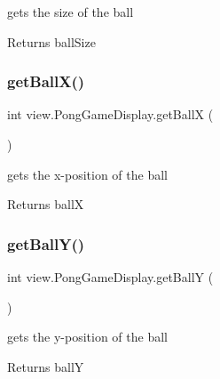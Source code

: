 gets the size of the ball 

\begin{DoxyReturn}{Returns}
ball\+Size 
\end{DoxyReturn}
\hypertarget{classview_1_1_pong_game_display_a83584a112f5bd8877e1bbb1d74dfa080}{}\label{classview_1_1_pong_game_display_a83584a112f5bd8877e1bbb1d74dfa080} 
\subsubsection{\texorpdfstring{get\+Ball\+X()}{getBallX()}}
{\footnotesize\ttfamily int view.\+Pong\+Game\+Display.\+get\+BallX (\begin{DoxyParamCaption}{ }\end{DoxyParamCaption})}



gets the x-\/position of the ball 

\begin{DoxyReturn}{Returns}
ballX 
\end{DoxyReturn}
\hypertarget{classview_1_1_pong_game_display_a940198a68c987548b182d18069ba5885}{}\label{classview_1_1_pong_game_display_a940198a68c987548b182d18069ba5885} 
\subsubsection{\texorpdfstring{get\+Ball\+Y()}{getBallY()}}
{\footnotesize\ttfamily int view.\+Pong\+Game\+Display.\+get\+BallY (\begin{DoxyParamCaption}{ }\end{DoxyParamCaption})}



gets the y-\/position of the ball 

\begin{DoxyReturn}{Returns}
ballY 
\end{DoxyReturn}
\hypertarget{classview_1_1_pong_game_display_a58685c652c4f3a3d7aa0c20c19ed4b11}{}\label{classview_1_1_pong_game_display_a58685c652c4f3a3d7aa0c20c19ed4b11} 
